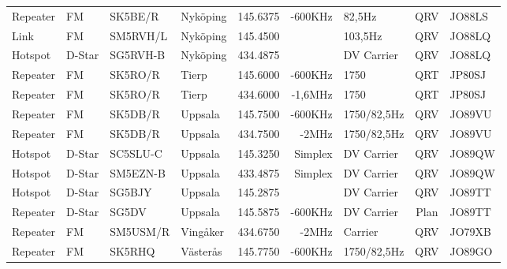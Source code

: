 \documentclass[10pt,swedish,a4paper,twoside]{article}
\begin{document}
\begin{landscape}
\begin{longtable}{llllrrlcl}
	Repeater          & FM           & SK5BE/R       & Nyköping          &          145.6375 &        -600KHz & 82,5Hz          &       QRV       & JO88LS           \\
	Link              & FM           & SM5RVH/L      & Nyköping          &          145.4500 &                & 103,5Hz         &       QRV       & JO88LQ           \\
	Hotspot           & D-Star       & SG5RVH-B      & Nyköping          &          434.4875 &                & DV Carrier      &       QRV       & JO88LQ           \\
	Repeater          & FM           & SK5RO/R       & Tierp             &          145.6000 &        -600KHz & 1750            &       QRT       & JP80SJ           \\
	Repeater          & FM           & SK5RO/R       & Tierp             &          434.6000 &        -1,6MHz & 1750            &       QRT       & JP80SJ           \\
	Repeater          & FM           & SK5DB/R       & Uppsala           &          145.7500 &        -600KHz & 1750/82,5Hz     &       QRV       & JO89VU           \\
	Repeater          & FM           & SK5DB/R       & Uppsala           &          434.7500 &          -2MHz & 1750/82,5Hz     &       QRV       & JO89VU           \\
	Hotspot           & D-Star       & SC5SLU-C      & Uppsala           &          145.3250 &        Simplex & DV Carrier      &       QRV       & JO89QW           \\
	Hotspot           & D-Star       & SM5EZN-B      & Uppsala           &          433.4875 &        Simplex & DV Carrier      &       QRV       & JO89QW           \\
	Hotspot           & D-Star       & SG5BJY        & Uppsala           &          145.2875 &                & DV Carrier      &       QRV       & JO89TT           \\
	Repeater          & D-Star       & SG5DV         & Uppsala           &          145.5875 &        -600KHz & DV Carrier      &      Plan       & JO89TT           \\
	Repeater          & FM           & SM5USM/R      & Vingåker          &          434.6750 &          -2MHz & Carrier         &       QRV       & JO79XB           \\
	Repeater          & FM           & SK5RHQ        & Västerås          &          145.7750 &        -600KHz & 1750/82,5Hz     &       QRV       & JO89GO
\end{longtable}
\normalsize



\end{landscape}
\end{document}
